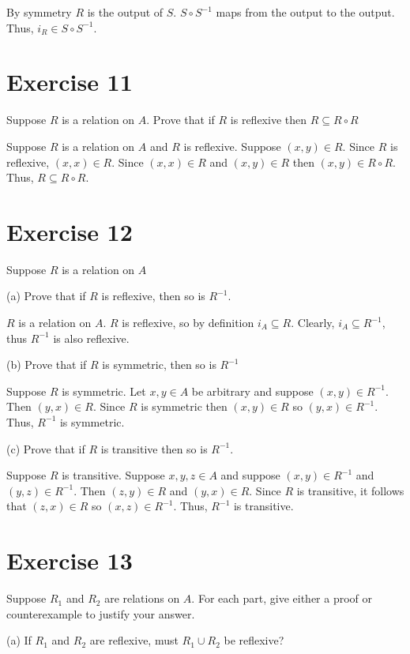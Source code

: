 \documentclass[11pt]{article}
\begin{document}
By symmetry $R$ is the output of $S$. $S \circ S^{-1}$ maps from the output to 
the output. Thus, $i_R \in S \circ S^{-1}$.

\section*{Exercise 11}

Suppose $R$ is a relation on $A$. Prove that if $R$ is reflexive then 
$R \subseteq R \circ R$

Suppose $R$ is a relation on $A$ and $R$ is reflexive. Suppose $(x, y) \in R$.
Since $R$ is reflexive, $(x, x) \in R$. Since $(x, x) \in R$ and 
$(x, y) \in R$ then $(x, y) \in R \circ R$. Thus, $R \subseteq R \circ R$.

\section*{Exercise 12}

Suppose $R$ is a relation on $A$

\noindent (a) Prove that if $R$ is reflexive, then so is $R^{-1}$.

$R$ is a relation on $A$. $R$ is reflexive, so by definition $i_A \subseteq R$.
Clearly, $i_A \subseteq R^{-1}$, thus $R^{-1}$ is also reflexive.

\noindent (b) Prove that if $R$ is symmetric, then so is $R^{-1}$

Suppose $R$ is symmetric. Let $x, y \in A$ be arbitrary and suppose 
$(x, y) \in R^{-1}$. Then $(y, x) \in R$. Since $R$ is symmetric then 
$(x, y) \in R$ so $(y, x) \in R^{-1}$. Thus, $R^{-1}$ is symmetric.

\noindent (c) Prove that if $R$ is transitive then so is $R^{-1}$.

Suppose $R$ is transitive. Suppose $x, y, z \in A$ and suppose $(x, y) \in R^{-1}$
and $(y, z) \in R^{-1}$. Then $(z, y) \in R$ and $(y, x) \in R$. Since $R$ is 
transitive, it follows that $(z, x) \in R$ so $(x, z) \in R^{-1}$. Thus, 
$R^{-1}$ is transitive.

\section*{Exercise 13}


Suppose $R_1$ and $R_2$ are relations on $A$. For each part, give either a 
proof or counterexample to justify your answer.

\noindent (a) If $R_1$ and $R_2$ are reflexive, must $R_1 \cup R_2$ be reflexive?
\end{document}
